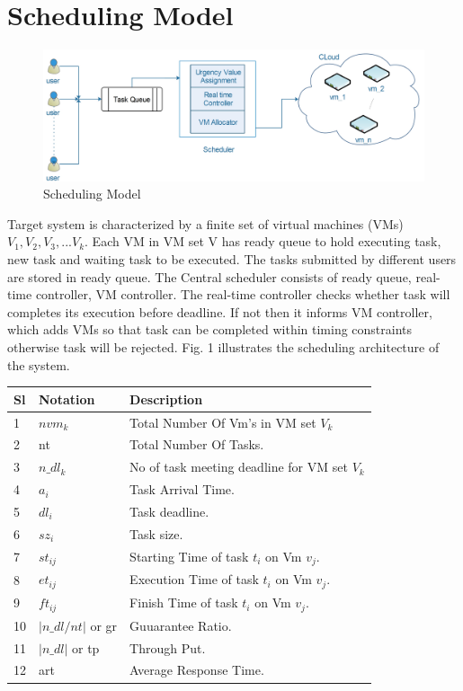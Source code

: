\documentclass[conference]{IEEEtran}
\begin{document}
\section{Scheduling Model}
\begin{figure}[htbp]
\includegraphics[scale=0.5]{model.jpg}
\caption{Scheduling Model}
\label{fig}
\end{figure}
Target system is characterized by a finite set of
virtual machines (VMs) $V_1, V_2, V_3, ... V_k$. Each VM in VM set V has ready queue to hold executing task, new task and waiting task to be executed. The tasks submitted by different users are stored in ready queue. The Central scheduler consists of ready queue, real-time controller, VM controller. The real-time controller checks whether task will completes its execution before deadline. If not then it informs VM controller, which adds VMs so that task can be completed within timing constraints otherwise task will be rejected. Fig. 1 illustrates the scheduling architecture of the system.\\

\begin{center}
    \begin{tabular}{| l | l | l |}
    \hline
    Sl & Notation & Description \\ \hline
    1 & $nvm_k$ & Total Number Of Vm's in VM set $V_k$\\ \hline
    2 & nt & Total Number Of Tasks. \\ \hline
    3 & $n\_dl_k$ & No of task meeting deadline for VM set $V_k$\\\hline
    4 & $a_i$ & Task Arrival Time. \\ \hline
    5 & $dl_i$ & Task deadline. \\ \hline
    6 & $sz_i$ & Task size. \\ \hline
    7 & $st_{ij}$ & Starting Time of task $t_i$ on Vm $v_j$. \\
    \hline
    8 & $et_{ij}$ & Execution Time of task $t_i$ on Vm $v_j$. \\ \hline
    9 & $ft_{ij}$ & Finish Time of task $t_i$ on Vm $v_j$. \\ \hline
    10 & $|n\_dl/nt|$ or gr & Guuarantee Ratio. \\ \hline
    11 & $|n\_dl|$ or tp & Through Put. \\ \hline
    12 & art & Average Response Time. \\
    \hline
    \end{tabular}
\end{center}
\end{document}
